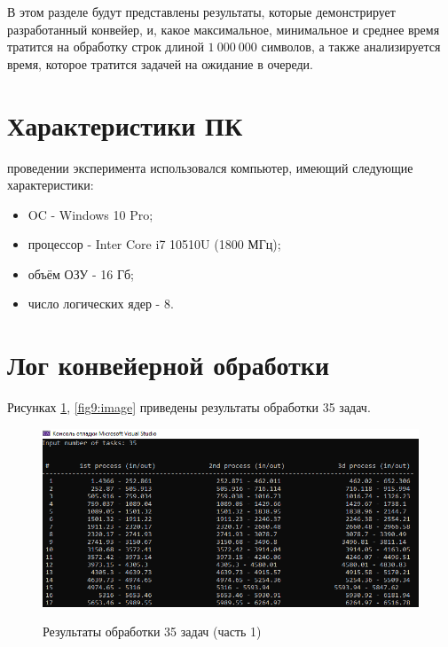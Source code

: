 В этом разделе будут представлены результаты, которые демонстрирует разработанный конвейер, и, какое максимальное, минимальное и среднее время тратится на обработку строк длиной $1\:000\:000$ символов, а также анализируется время, которое тратится задачей на ожидание в очереди.

\section{Характеристики ПК}
 проведении эксперимента использовался компьютер, имеющий следующие характеристики:
\begin{itemize}
	\item OC - Windows 10 Pro;
	\item процессор - Inter Core i7 10510U (1800 МГц);
	\item объём ОЗУ - 16 Гб;
	\item число логических ядер - 8.
\end{itemize}

\section{Лог конвейерной обработки}
 Рисунках \ref{fig8:image}, \ref{fig9:image} приведены результаты обработки 35 задач.

\begin{figure}[h]
	\begin{center}
		{\includegraphics[scale = 0.85]{results/result_1_part_1}}
		\caption{Результаты обработки 35 задач (часть 1)}
		\label{fig8:image}
	\end{center}
\end{figure}

